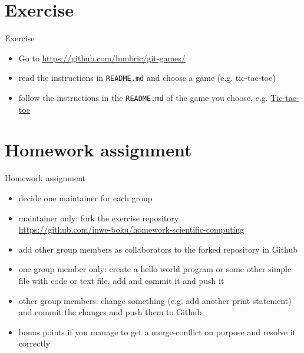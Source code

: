 \section{Exercise}

\begin{frame}[fragile]{Exercise}
    \begin{itemize}
        \item Go to \href{https://github.com/lumbric/git-games/}{https://github.com/lumbric/git-games/}
        \item read the instructions in \verb|README.md| and choose a game (e.g. tic-tac-toe)
        \item follow the instructions in the \verb|README.md| of the game you choose, e.g.
            \href{https://github.com/lumbric/git-games/tree/master/tic-tac-toe#how-to-play}{Tic-tac-toe}

    \end{itemize}
\end{frame}


\section{Homework assignment}

\begin{frame}[fragile]{Homework assignment}
    \begin{itemize}
        \item decide one maintainer for each group
        \item maintainer only: fork the exercise repository\\
            \href{https://github.com/inwe-boku/homework-scientific-computing}{https://github.com/inwe-boku/homework-scientific-computing}
        \item add other group members as collaborators to the forked repository in Github
        \item one group member only: create a hello world program or some other simple file with
            code or text file, add and commit it and push it
        \item other group members: change something (e.g. add another print statement) and commit
          the changes and push them to Github
        \item bonus points if you manage to get a merge-conflict on purpose and resolve it correctly
    \end{itemize}
\end{frame}


